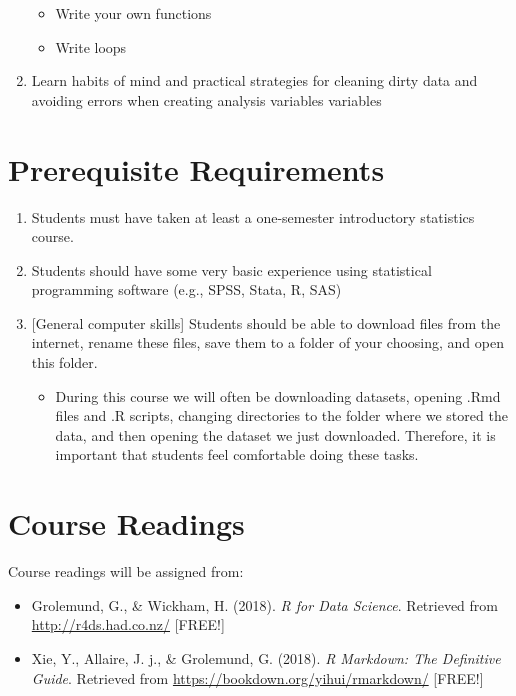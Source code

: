 \documentclass[11pt,]{article}
\providecommand{\tightlist}{%
  \setlength{\itemsep}{0pt}\setlength{\parskip}{0pt}}
\begin{document}
\begin{enumerate}
  \begin{itemize}
  \tightlist
  \item
    Write your own functions
  \item
    Write loops
  \end{itemize}
\item
  Learn habits of mind and practical strategies for cleaning dirty data
  and avoiding errors when creating analysis variables variables
\end{enumerate}

\section{Prerequisite Requirements}\label{prerequisite-requirements}

\begin{enumerate}
\def\labelenumi{\arabic{enumi}.}
\tightlist
\item
  Students must have taken at least a one-semester introductory
  statistics course.\\
\item
  Students should have some very basic experience using statistical
  programming software (e.g., SPSS, Stata, R, SAS)
\item
  {[}General computer skills{]} Students should be able to download
  files from the internet, rename these files, save them to a folder of
  your choosing, and open this folder.

  \begin{itemize}
  \tightlist
  \item
    During this course we will often be downloading datasets, opening
    .Rmd files and .R scripts, changing directories to the folder where
    we stored the data, and then opening the dataset we just downloaded.
    Therefore, it is important that students feel comfortable doing
    these tasks.
  \end{itemize}
\end{enumerate}

\section{Course Readings}\label{course-readings}

Course readings will be assigned from:

\begin{itemize}
\tightlist
\item
  Grolemund, G., \& Wickham, H. (2018). \emph{R for Data Science}.
  Retrieved from \url{http://r4ds.had.co.nz/} {[}FREE!{]}
\item
  Xie, Y., Allaire, J. j., \& Grolemund, G. (2018). \emph{R Markdown:
  The Definitive Guide}. Retrieved from
  \url{https://bookdown.org/yihui/rmarkdown/} {[}FREE!{]}
\end{itemize}
\end{document}

